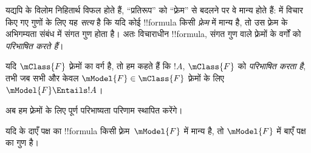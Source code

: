 \documentclass[../../../include/open-logic-section]{subfiles}
\begin{document}


यद्यपि  के विलोम निहितार्थ विफल होते हैं,
``प्रतिरूप'' को ``फ़्रेम'' से बदलने पर वे मान्य होते हैं:
 में विचार किए गए गुणों के लिए यह \emph{सत्य}
है कि यदि कोई !!{formula} किसी \emph{फ़्रेम} में मान्य है, तो उस फ़्रेम के
अभिगम्यता संबंध में संगत गुण होता है। अतः विचाराधीन !!{formula}, संगत गुण वाले
फ़्रेमों के वर्गों को \emph{परिभाषित करते हैं}।

\begin{defn}
  यदि $\mClass{F}$ फ़्रेमों का वर्ग है, तो हम कहते हैं कि $!A$,
  $\mClass{F}$ को \emph{परिभाषित करता है}, तभी जब सभी और केवल
  $\mModel{F} \in \mClass{F}$ फ़्रेमों के लिए $\mModel{F} \Entails !A$।
\end{defn}

अब हम फ़्रेमों के लिए पूर्ण परिभाष्यता परिणाम स्थापित करेंगे।

\begin{thm}
यदि  के दाएँ पक्ष का !!{formula} किसी
फ़्रेम~$\mModel{F}$ में मान्य है, तो $\mModel{F}$ में बाएँ पक्ष का गुण है।
\end{thm}
\end{document}
